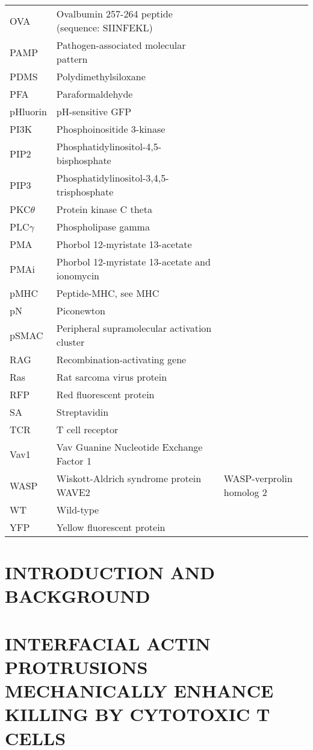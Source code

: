 \documentclass[phd,tocprelim]{cornell}
\begin{document}
\begin{table}
\begin{tabular}{l m{10cm} l}
	OVA & Ovalbumin 257-264 peptide (sequence: SIINFEKL) \\
	PAMP & Pathogen-associated molecular pattern \\
	PDMS & Polydimethylsiloxane \\
	PFA & Paraformaldehyde \\
	pHluorin & pH-sensitive GFP \\
	PI3K & Phosphoinositide 3-kinase \\
	PIP2 & Phosphatidylinositol-4,5-bisphosphate \\
	PIP3 & Phosphatidylinositol-3,4,5-trisphosphate \\
	PKC$\theta$ & Protein kinase C theta \\
	PLC$\gamma$ & Phospholipase gamma \\
	PMA & Phorbol 12-myristate 13-acetate \\
	PMAi & Phorbol 12-myristate 13-acetate and ionomycin \\
	pMHC & Peptide-MHC, see MHC \\
	pN & Piconewton \\
	pSMAC & Peripheral supramolecular activation cluster \\
	RAG & Recombination-activating gene \\
	Ras & Rat sarcoma virus protein \\
	RFP & Red fluorescent protein \\
	SA & Streptavidin \\
	TCR & T cell receptor \\
	Vav1 & Vav Guanine Nucleotide Exchange Factor 1 \\
	WASP & Wiskott-Aldrich syndrome protein
	WAVE2 & WASP-verprolin homolog 2 \\
	WT & Wild-type \\
	YFP & Yellow fluorescent protein \\
	\bottomrule
	\end{tabular}
	\label{tab:abbreviations}
\end{table}
%

\chapter{INTRODUCTION AND BACKGROUND}


\chapter{INTERFACIAL ACTIN PROTRUSIONS MECHANICALLY ENHANCE KILLING BY CYTOTOXIC T CELLS }
\label{chap:protrusions}

\end{document}
